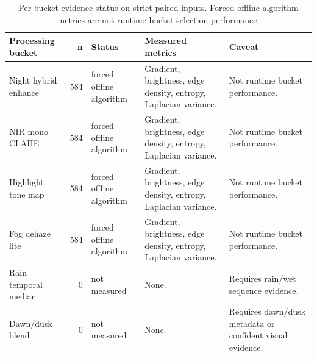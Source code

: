 \begin{table}[!htbp]
\centering
\footnotesize
\caption{Per-bucket evidence status on strict paired inputs. Forced offline algorithm metrics are not runtime bucket-selection performance.}
\label{tab:ch6-fusion-bucket-evidence}
\begin{tabularx}{\textwidth}{@{}lrlXX@{}}
\hline
\textbf{Processing bucket} & \textbf{n} & \textbf{Status} & \textbf{Measured metrics} & \textbf{Caveat} \\
\hline
Night hybrid enhance & 584 & forced offline algorithm & Gradient, brightness, edge density, entropy, Laplacian variance. & Not runtime bucket performance. \\
NIR mono CLAHE & 584 & forced offline algorithm & Gradient, brightness, edge density, entropy, Laplacian variance. & Not runtime bucket performance. \\
Highlight tone map & 584 & forced offline algorithm & Gradient, brightness, edge density, entropy, Laplacian variance. & Not runtime bucket performance. \\
Fog dehaze lite & 584 & forced offline algorithm & Gradient, brightness, edge density, entropy, Laplacian variance. & Not runtime bucket performance. \\
Rain temporal median & 0 & not measured & None. & Requires rain/wet sequence evidence. \\
Dawn/dusk blend & 0 & not measured & None. & Requires dawn/dusk metadata or confident visual evidence. \\
\hline
\end{tabularx}
\end{table}
